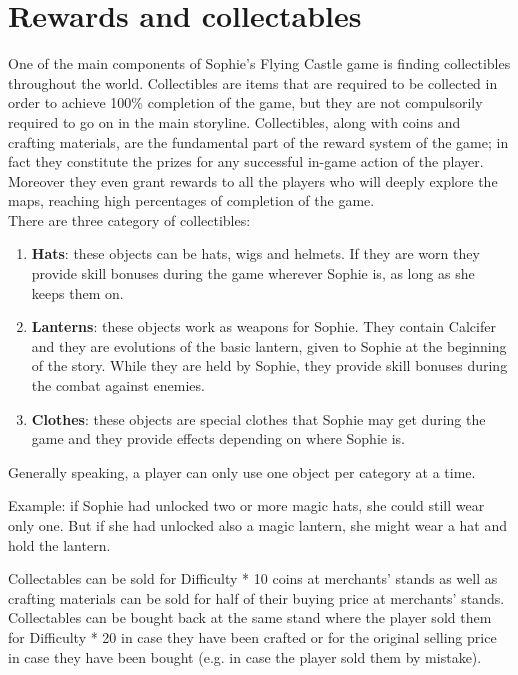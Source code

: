 \section{Rewards and collectables}
One of the main components of Sophie's Flying Castle game is finding collectibles throughout the world.
Collectibles are items that are required to be collected in order to achieve 100\%
completion of the game, but they are not compulsorily required to go on in the main storyline. Collectibles, along with coins and crafting materials, are the fundamental part of the reward system of the game; in fact they constitute the prizes for any successful in-game action of the player. Moreover they even grant rewards to all the players who will deeply explore the maps, reaching high percentages of completion of the game.\\

There are three category of collectibles:
\begin{enumerate}
\item \textbf{Hats}: these objects can be hats, wigs and helmets. If they are worn they provide skill bonuses during the game wherever Sophie is, as long as she keeps them on.
\item \textbf{Lanterns}: these objects work as weapons for Sophie. They contain Calcifer and they are evolutions of the basic lantern, given to Sophie at the beginning of the story. While they are held by Sophie, they provide skill bonuses during the combat against enemies. 
\item \textbf{Clothes}: these objects are special clothes that Sophie may get during the game and they provide effects depending on where Sophie is.  
  \end{enumerate}

Generally speaking, a player can only use one object per category at a time.

Example: if Sophie had unlocked two or more magic hats, she could still wear only one. But if she had unlocked also a magic lantern, she might wear a hat and hold the lantern.

Collectables can be sold for Difficulty * 10 coins at merchants' stands as well as crafting materials can be sold for half of their buying price at merchants' stands. Collectables can be bought back at the same stand where the player sold them for Difficulty * 20 in case they have been crafted or for the original selling price in case they have been bought (e.g. in case the player sold them by mistake).



